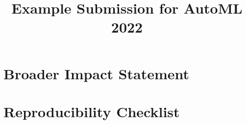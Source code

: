 \documentclass[11pt]{article}
\title{Example Submission for AutoML 2022}
\author[1]{\nameemail{Author 1}{email1@example.com}}
\affil[1]{Institution 1}
\begin{document}
\maketitle

\begin{abstract}
\end{abstract}

\section{Broader Impact Statement}


%

\section{Reproducibility Checklist}

%
%
%
%
%
%
%
%
%
%
%
\end{document}
